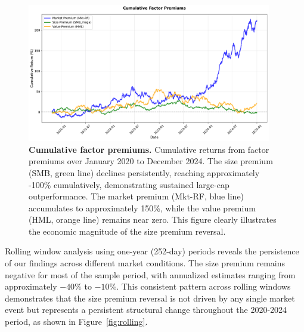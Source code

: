 \documentclass[10pt,letterpaper]{article}
\begin{document}
\begin{figure}[!h]
\centering
\includegraphics[width=0.95\textwidth]{figures/fig4_cumulative_returns.pdf}
\caption{\textbf{Cumulative factor premiums.}
Cumulative returns from factor premiums over January 2020 to December 2024. The size premium (SMB, green line) declines persistently, reaching approximately -100\% cumulatively, demonstrating sustained large-cap outperformance. The market premium (Mkt-RF, blue line) accumulates to approximately 150\%, while the value premium (HML, orange line) remains near zero. This figure clearly illustrates the economic magnitude of the size premium reversal.}
\label{fig:cumulative}
\end{figure}

Rolling window analysis using one-year (252-day) periods reveals the persistence of our findings across different market conditions. The size premium remains negative for most of the sample period, with annualized estimates ranging from approximately $-40\%$ to $-10\%$. This consistent pattern across rolling windows demonstrates that the size premium reversal is not driven by any single market event but represents a persistent structural change throughout the 2020-2024 period, as shown in Figure~\ref{fig:rolling}.
\end{document}
